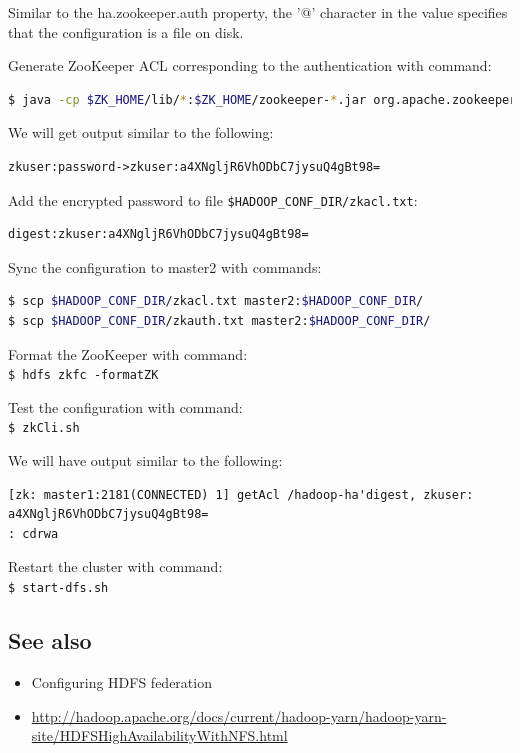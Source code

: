 Similar to the ha.zookeeper.auth property, the '@' character in the value specifies that the configuration is a file on disk.

Generate ZooKeeper ACL corresponding to the authentication with command: \\
\lstset{style=bashstyle}
\begin{lstlisting}[language=bash]
$ java -cp $ZK_HOME/lib/*:$ZK_HOME/zookeeper-*.jar org.apache.zookeeper.server.auth.DigestAuthenticationProvider zkuser:password
\end{lstlisting}

We will get output similar to the following:
\lstset{style=bashstyle}
\begin{lstlisting}
zkuser:password->zkuser:a4XNgljR6VhODbC7jysuQ4gBt98=
\end{lstlisting}

Add the encrypted password to file \verb|$HADOOP_CONF_DIR/zkacl.txt|:
\lstset{style=bashstyle}
\begin{lstlisting}
digest:zkuser:a4XNgljR6VhODbC7jysuQ4gBt98=
\end{lstlisting}

Sync the configuration to master2 with commands:
\lstset{style=bashstyle}
\begin{lstlisting}[language=bash]
$ scp $HADOOP_CONF_DIR/zkacl.txt master2:$HADOOP_CONF_DIR/
$ scp $HADOOP_CONF_DIR/zkauth.txt master2:$HADOOP_CONF_DIR/
\end{lstlisting}

Format the ZooKeeper with command: \\
\verb|$ hdfs zkfc -formatZK|

Test the configuration with command: \\
\verb|$ zkCli.sh|

We will have output similar to the following:
\lstset{style=bashstyle}
\begin{lstlisting}
[zk: master1:2181(CONNECTED) 1] getAcl /hadoop-ha'digest, zkuser: a4XNgljR6VhODbC7jysuQ4gBt98=
: cdrwa
\end{lstlisting}

Restart the cluster with command: \\
\verb|$ start-dfs.sh|

\subsection*{See also}
\begin{itemize}
  \item Configuring HDFS federation
  \item \url{http://hadoop.apache.org/docs/current/hadoop-yarn/hadoop-yarn-site/HDFSHighAvailabilityWithNFS.html}
\end{itemize}

